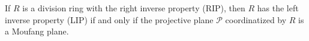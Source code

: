 If $R$ is a division ring with the right inverse property (RIP), then $R$ has the left inverse property (LIP) if and only if the projective plane $\mathcal{P}$ coordinatized by $R$ is a Moufang plane.
